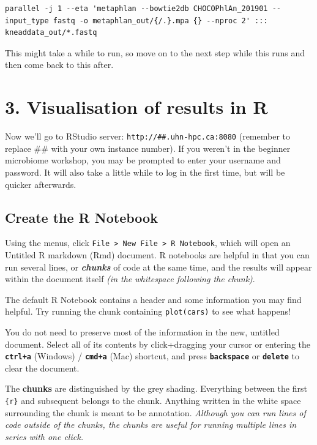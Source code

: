 \documentclass[
]{book}
\begin{document}
\begin{verbatim}
parallel -j 1 --eta 'metaphlan --bowtie2db CHOCOPhlAn_201901 --input_type fastq -o metaphlan_out/{/.}.mpa {} --nproc 2' ::: kneaddata_out/*.fastq
\end{verbatim}

This might take a while to run, so move on to the next step while this runs and then come back to this after.

\section{3. Visualisation of results in R}\label{visualisation-of-results-in-r}

Now we'll go to RStudio server: \texttt{http://\#\#.uhn-hpc.ca:8080} (remember to replace \#\# with your own instance number). If you weren't in the beginner microbiome workshop, you may be prompted to enter your username and password. It will also take a little while to log in the first time, but will be quicker afterwards.

\subsection{Create the R Notebook}\label{create-the-r-notebook}

Using the menus, click \texttt{File\ \textgreater{}\ New\ File\ \textgreater{}\ R\ Notebook}, which will open an Untitled R markdown (Rmd) document. R notebooks are helpful in that you can run several lines, or \textbf{\emph{chunks}} of code at the same time, and the results will appear within the document itself \emph{(in the whitespace following the chunk)}.

The default R Notebook contains a header and some information you may find helpful. Try running the chunk containing \texttt{plot(cars)} to see what happens!

You do not need to preserve most of the information in the new, untitled document. Select all of its contents by click+dragging your cursor or entering the \textbf{\texttt{ctrl+a}} (Windows) / \textbf{\texttt{cmd+a}} (Mac) shortcut, and press \textbf{\texttt{backspace}} or \textbf{\texttt{delete}} to clear the document.

The \textbf{chunks} are distinguished by the grey shading. Everything between the first \texttt{\textasciigrave{}\textasciigrave{}\textasciigrave{}\{r\}} and subsequent\texttt{\textasciigrave{}\textasciigrave{}\textasciigrave{}} belongs to the chunk. Anything written in the white space surrounding the chunk is meant to be annotation. \emph{Although you can run lines of code outside of the chunks, the chunks are useful for running multiple lines in series with one click.}
\end{document}
